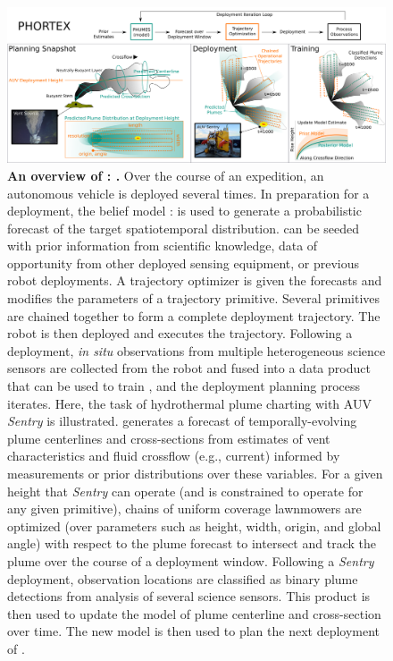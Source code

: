 \begin{figure}[h!]
    \centering
    \includegraphics[width=\columnwidth]{figures/summary_intro_figure.png}
    \caption{\textbf{An overview of \PHORTEX: \phortex.} Over the course of an expedition, an autonomous vehicle is deployed several times. In preparation for a deployment, the belief model \PHUMES: \phumes is used to generate a probabilistic forecast of the target spatiotemporal distribution. \PHUMES can be seeded with prior information from scientific knowledge, data of opportunity from other deployed sensing equipment, or previous robot deployments. A trajectory optimizer is given the forecasts and modifies the parameters of a trajectory primitive. Several primitives are chained together to form a complete deployment trajectory. The robot is then deployed and executes the trajectory. Following a deployment, \emph{in situ} observations from multiple heterogeneous science sensors are collected from the robot and fused into a data product that can be used to train \PHUMES, and the deployment planning process iterates. Here, the task of hydrothermal plume charting with AUV \emph{Sentry} is illustrated. \PHUMES generates a forecast of temporally-evolving plume centerlines and cross-sections from estimates of vent characteristics and fluid crossflow (e.g., current) informed by measurements or prior distributions over these variables. For a given height that \emph{Sentry} can operate (and is constrained to operate for any given primitive), chains of uniform coverage lawnmowers are optimized (over parameters such as height, width, origin, and global angle) with respect to the plume forecast to intersect and track the plume over the course of a deployment window. Following a \emph{Sentry} deployment, observation locations are classified as binary plume detections from analysis of several science sensors. This product is then used to update the \PHUMES model of plume centerline and cross-section over time. The new \PHUMES model is then used to plan the next deployment of \Sentry.}
    \label{fig:intro_summary}
\end{figure}


